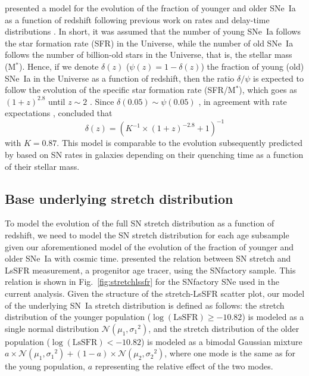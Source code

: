 \documentclass[]{aa}
\begin{document}
\cite{rigault2020} presented a model for the evolution of the fraction of
younger and older SNe~Ia as a function of redshift following previous work on
rates and delay-time distributions \citep[e.g.,][]{mannucci2005,
scannapieco2005, sullivan2006, smith2012, childress2014, maozmannucci2014}. In
short, it was assumed that the number of young SNe~Ia follows the star formation
rate (SFR) in the Universe, while the number of old SNe~Ia follows the number of
billion-old stars in the Universe, that is, the stellar mass (M$^*$). Hence, if
we denote $\delta(z)$ ($\psi(z) = 1-\delta(z)$) the fraction of young (old)
SNe~Ia in the Universe as a function of redshift, then the ratio $\delta/\psi$
is expected to follow the evolution of the specific star formation rate
(SFR/M$^*$), which goes as $(1+z)^{2.8}$ until $z\sim2$
\citep[e.g.,][]{tasca2015}. Since $\delta(0.05) \sim \psi(0.05)$
\citep{rigault2013, rigault2020, wiseman2020}, in agreement with rate
expectations \citep{mannucci2006, rodney2014}, \cite{rigault2020} concluded that
\begin{equation}
    \label{eq:delta}
    \delta(z) = \left( K^{-1} \times (1+z)^{-2.8} +1 \right)^{-1}
\end{equation}
with $K=0.87$. This model is comparable to the evolution subsequently
predicted by \cite{childress2014} based on SN rates in galaxies depending on
their quenching time as a function of their stellar mass.

\subsection{Base underlying stretch distribution}
\label{sec:basemodel}

To model the evolution of the full SN stretch distribution as a function of
redshift, we need to model the SN stretch distribution for each age subsample
given our aforementioned model of the evolution of the fraction of younger and
older SNe~Ia with cosmic time. \cite{rigault2020} presented the relation between
SN stretch and LsSFR measurement, a progenitor age tracer, using the SNfactory
sample. This relation is shown in Fig.~\ref{fig:stretchlssfr} for the SNfactory
SNe used in the current analysis. Given the structure of the stretch-LsSFR
scatter plot, our model of the underlying SN~Ia stretch distribution is defined
as follows: the stretch distribution of the younger population
($\log(\mathrm{LsSFR})\geq-10.82$) is modeled as a single normal distribution
$\mathcal{N}(\mu_1, \sigma_1{}^2)$, and the stretch distribution of the older
population ($\log(\mathrm{LsSFR})<-10.82$) is modeled as a bimodal Gaussian
mixture $a\times \mathcal{N}(\mu_1, \sigma_1{}^2) + (1-a)\times
\mathcal{N}(\mu_2, \sigma_2{}^2)$, where one mode is the same as for the young
population, $a$ representing the relative effect of the two modes.
\end{document}
